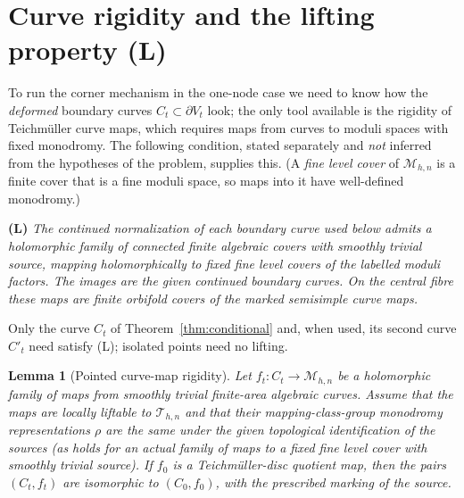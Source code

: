 \documentclass[11pt]{article}
\newcommand{\M}{\mathcal M}
\newcommand{\T}{\mathcal T}
\newtheorem{lemma}[theorem]{Lemma}
\theoremstyle{remark}
\begin{document}
\section{Curve rigidity and the lifting property (L)}\label{sec:lifting}

To run the corner mechanism in the one-node case we need to know
how the \emph{deformed} boundary curves \(C_t\subset\partial V_t\)
look; the only tool available is the rigidity of Teichm\"uller
curve maps, which requires maps from curves to moduli spaces with
fixed monodromy. The following condition, stated separately and
\emph{not} inferred from the hypotheses of the problem, supplies
this. (A \emph{fine level cover} of \(\M_{h,n}\) is a finite cover
that is a fine moduli space, so maps into it have well-defined
monodromy.)

\noindent\textbf{(L)} \emph{The continued normalization of each
boundary curve used below admits a holomorphic family of connected
finite algebraic covers with smoothly trivial source, mapping
holomorphically to fixed fine level covers of the labelled moduli
factors. The images are the given continued boundary curves. On the
central fibre these maps are finite orbifold covers of the marked
semisimple curve maps.}

\noindent Only the curve \(C_t\) of Theorem~\ref{thm:conditional}
and, when used, its second curve \(C'_t\) need satisfy (L); isolated
points need no lifting.

\begin{lemma}[Pointed curve-map rigidity]\label{lem:pointed}
Let \(f_t:C_t\to\M_{h,n}\) be a holomorphic family of maps from
smoothly trivial finite-area algebraic curves. Assume that the maps
are locally liftable to \(\T_{h,n}\) and that their
mapping-class-group monodromy representations \(\rho\) are the same
under the given topological identification of the sources (as holds
for an actual family of maps to a fixed fine level
cover with smoothly trivial source). If \(f_0\) is a
Teichm\"uller-disc quotient map, then the pairs \((C_t,f_t)\) are
isomorphic to \((C_0,f_0)\), with the prescribed marking of the source.
\end{lemma}

\end{document}
